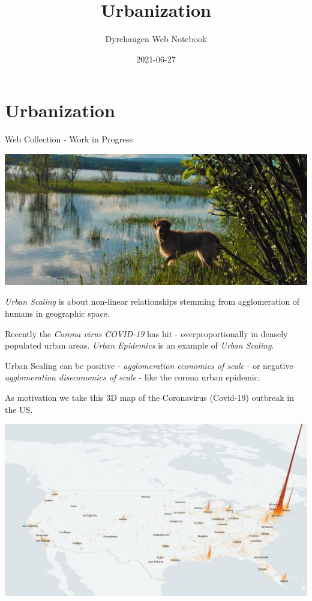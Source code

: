 \documentclass[
]{book}
\title{Urbanization}
\author{Dyrehaugen Web Notebook}
\date{2021-06-27}
\begin{document}
\maketitle

{
\setcounter{tocdepth}{1}
\tableofcontents
}
\hypertarget{urbanization}{%
\chapter{Urbanization}\label{urbanization}}

Web Collection - Work in Progress

\includegraphics{fig/zelda.jpg}

\emph{Urban Scaling} is about non-linear relationships stemming from agglomeration of humans
in geographic space.

Recently the \emph{Corona virus COVID-19} has hit - overproportionally in densely populated urban areas.
\emph{Urban Epidemics} is an example of \emph{Urban Scaling}.

Urban Scaling can be positive - \emph{agglomeration economics of scale} - or negative
\emph{agglomeration diseconomics of scale} - like the corona urban epidemic.

As motivation we take this 3D map of the Coronavirus (Covid-19) outbreak in the US.

\includegraphics{fig/Corona_Cases_pc_US_3D.jpeg}
\end{document}
